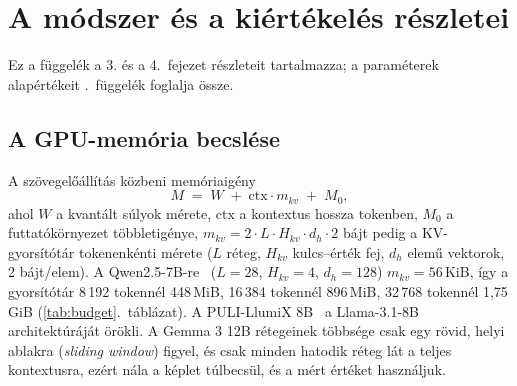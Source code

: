 
\chapter{A módszer és a kiértékelés részletei}
\label{app-modszer}

Ez a függelék a 3. és a 4.~fejezet részleteit tartalmazza; a paraméterek
alapértékeit \az{\ref{app-reprodukcio}}.~függelék foglalja össze.

\section{A GPU-memória becslése}
\label{app-vram}

A szövegelőállítás közbeni memóriaigény
\begin{equation}
M \;=\; W \;+\; \mathrm{ctx}\cdot m_{kv} \;+\; M_0,
\label{eq:vram}
\end{equation}
ahol $W$ a kvantált súlyok mérete, $\mathrm{ctx}$ a kontextus hossza tokenben, $M_0$ a
futtatókörnyezet többletigénye, $m_{kv}=2\cdot L\cdot H_{kv}\cdot d_h\cdot 2$ bájt pedig a
KV-gyorsítótár tokenenkénti mérete ($L$ réteg, $H_{kv}$ kulcs--érték fej, $d_h$ elemű vektorok, 2
bájt/elem). A Qwen2.5-7B-re~\cite{qwen25} ($L=28$, $H_{kv}=4$, $d_h=128$) $m_{kv}=56$\,KiB, így a
gyorsítótár 8\,192 tokennél 448\,MiB, 16\,384 tokennél 896\,MiB, 32\,768 tokennél 1,75\,GiB
(\ref{tab:budget}.~táblázat). A PULI-LlumiX 8B~\cite{pulillumix} a Llama-3.1-8B architektúráját örökli. A
Gemma 3 12B rétegeinek többsége csak egy rövid, helyi ablakra (\emph{sliding window}) figyel, és csak
minden hatodik réteg lát a teljes kontextusra, ezért nála a képlet túlbecsül, és a mért értéket
használjuk.

